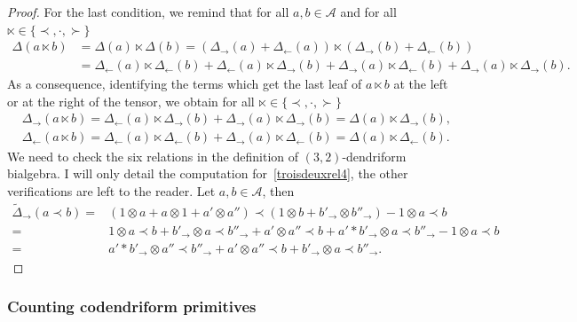 \documentclass[pdftex]{sigma}
\numberwithin{equation}{section}
\theoremstyle{definition}
\theoremstyle{plain}
\begin{document}
\begin{proof}
	For the last condition, we remind that for all $a,b\in \mathcal{A}$ and for all $\ltimes\in\{ \prec,\cdot,\succ\}$
	\begin{align*}
		\Delta(a\ltimes b)
		&= \Delta(a)\ltimes \Delta(b) = (\Delta_{\rightarrow}(a)+\Delta_{\leftarrow}(a))\ltimes (\Delta_{\rightarrow}(b)+\Delta_{\leftarrow}(b)) \\
		&= \Delta_{\leftarrow}(a)\ltimes \Delta_{\leftarrow}(b)+\Delta_{\leftarrow}(a)\ltimes \Delta_{\rightarrow}(b)+
		\Delta_{\rightarrow}(a)\ltimes \Delta_{\leftarrow}(b)+
		\Delta_{\rightarrow}(a)\ltimes \Delta_{\rightarrow}(b).
	\end{align*}
As a consequence, identifying the terms which get the last leaf of $a\ltimes b$ at the left or at the right of the tensor, we obtain for all $\ltimes\in\{\prec,\cdot,\succ\}$
	\begin{align*}
		&\Delta_{\rightarrow}(a\ltimes b) =\Delta_{\leftarrow}(a)\ltimes \Delta_{\rightarrow}(b)+\Delta_{\rightarrow}(a)\ltimes \Delta_{\rightarrow}(b) =\Delta(a)\ltimes \Delta_{\rightarrow}(b), \\
		&\Delta_{\leftarrow}(a\ltimes b)
		 =\Delta_{\leftarrow}(a)\ltimes\Delta_{\leftarrow}(b)+\Delta_{\rightarrow}(a)\ltimes \Delta_{\leftarrow}(b) =\Delta(a)\ltimes \Delta_{\leftarrow}(b).
	\end{align*}
We need to check the six relations in the definition of $(3,2)$-dendriform bialgebra. I will only detail the computation for~\eqref{troisdeuxrel4}, the other verifications are left to the reader. Let $a,b\in \mathcal{A}$, then
	\begin{align*}
		\tilde{\Delta}_{\rightarrow}(a\prec b)
		={}&(1\otimes a + a\otimes 1+a'\otimes a'')\prec (1\otimes b+b'_{\rightarrow}\otimes b''_{\rightarrow})- 1\otimes a\prec b\\
		={}&1\otimes a\prec b+b'_{\rightarrow}\otimes a\prec b''_{\rightarrow}+ a'\otimes a''\prec b+a'*b'_{\rightarrow}\otimes a\prec b''_{\rightarrow}-1\otimes a\prec b \\
		={}& a'*b'_{\rightarrow}\otimes a''\prec b''_{\rightarrow}+a'\otimes a''\prec b+b'_{\rightarrow}\otimes a\prec b''_{\rightarrow}. \tag*{\qed}
	\end{align*}
\renewcommand{\qed}{}
\end{proof}

\subsubsection{Counting codendriform primitives}
\end{document}
